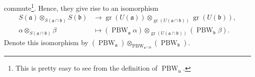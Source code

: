 \documentclass
[numbers=enddot,12pt,final,onecolumn,german,notitlepage]{scrartcl}%
\theoremstyle{definition}
\begin{document}
commute\footnote{This is pretty easy to see from the definition of
$\operatorname*{PBW}\nolimits_{\mathfrak{u}}$.}. Hence, they give rise to an
isomorphism%
\begin{align*}
S\left(  \mathfrak{a}\right)  \otimes_{S\left(  \mathfrak{a}\cap
\mathfrak{b}\right)  }S\left(  \mathfrak{b}\right)   &  \rightarrow
\operatorname*{gr}\left(  U\left(  \mathfrak{a}\right)  \right)
\otimes_{\operatorname*{gr}\left(  U\left(  \mathfrak{a}\cap\mathfrak{b}%
\right)  \right)  }\operatorname*{gr}\left(  U\left(  \mathfrak{b}\right)
\right)  ,\\
\alpha\otimes_{S\left(  \mathfrak{a}\cap\mathfrak{b}\right)  }\beta &
\mapsto\left(  \operatorname*{PBW}\nolimits_{\mathfrak{a}}\alpha\right)
\otimes_{\operatorname*{gr}\left(  U\left(  \mathfrak{a}\cap\mathfrak{b}%
\right)  \right)  }\left(  \operatorname*{PBW}\nolimits_{\mathfrak{b}}%
\beta\right)  .
\end{align*}
Denote this isomorphism by $\left(  \operatorname*{PBW}\nolimits_{\mathfrak{a}%
}\right)  \otimes_{\operatorname*{PBW}\nolimits_{\mathfrak{a}\cap\mathfrak{b}%
}}\left(  \operatorname*{PBW}\nolimits_{\mathfrak{b}}\right)  $.
\end{document}
